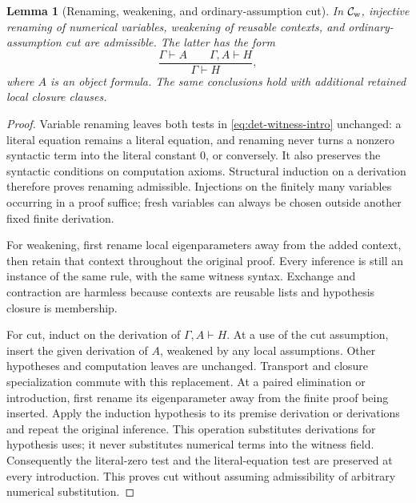 \documentclass[11pt,letterpaper]{article}
\newtheorem{lemma}[theorem]{Lemma}
\theoremstyle{definition}\newtheorem{definition}[theorem]{Definition}
\theoremstyle{remark}\newtheorem{remark}[theorem]{Remark}
\begin{document}
\begin{lemma}[Renaming, weakening, and ordinary-assumption cut]
\label{lem:det-witness-cut}
In $\mathcal C_{\rm w}$, injective renaming of numerical variables,
weakening of reusable contexts, and ordinary-assumption cut are
admissible.  The latter has the form
\[
 \frac{\Gamma\vdash A\qquad\Gamma,A\vdash H}
      {\Gamma\vdash H},
\]
where $A$ is an object formula.  The same conclusions hold with additional
retained local closure clauses.
\end{lemma}
\begin{proof}
Variable renaming leaves both tests in
\eqref{eq:det-witness-intro} unchanged: a literal equation remains a
literal equation, and renaming never turns a nonzero syntactic term
into the literal constant $0$, or conversely.  It also preserves the
syntactic conditions on computation axioms.  Structural induction on
a derivation therefore proves renaming admissible.  Injections on the
finitely many variables occurring in a proof suffice; fresh variables
can always be chosen outside another fixed finite derivation.

For weakening, first rename local eigenparameters away from the added
context, then retain that context throughout the original proof.
Every inference is still an instance of the same rule, with the same
witness syntax.  Exchange and contraction are harmless because contexts
are reusable lists and hypothesis closure is membership.

For cut, induct on the derivation of $\Gamma,A\vdash H$.  At a use
of the cut assumption, insert the given derivation of $A$, weakened by
any local assumptions.  Other hypotheses and computation leaves are
unchanged.  Transport and closure specialization commute with this
replacement.  At a paired elimination or introduction, first rename
its eigenparameter away from the finite proof being inserted.  Apply
the induction hypothesis to its premise derivation or derivations and
repeat the original inference.  This operation substitutes derivations
for hypothesis uses; it never substitutes numerical terms into the
witness field.  Consequently the literal-zero test and the
literal-equation test are preserved at every introduction.  This proves
cut without assuming admissibility of arbitrary numerical substitution.
\end{proof}
\end{document}
